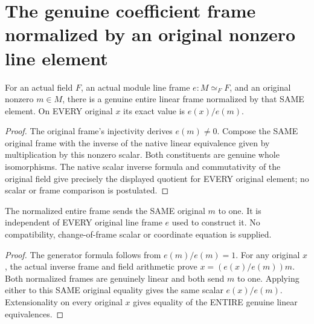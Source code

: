 \section{The genuine coefficient frame normalized by an original nonzero line element}
\label{sec:normalized-line-frame}

\begin{definition}
\label{sc0-normalized-line-frame:whole-equivalence}
\leanok
For an actual field $F$, an actual module line frame $e:M\simeq_F F$,
and an original nonzero $m\in M$, there is a genuine entire linear
frame normalized by that SAME element. On EVERY original $x$ its exact
value is $e(x)/e(m)$.
\end{definition}
\begin{proof}
The original frame's injectivity derives $e(m)\ne0$. Compose the SAME
original frame with the inverse of the native linear equivalence given
by multiplication by this nonzero scalar. Both constituents are genuine
whole isomorphisms. The native scalar inverse formula and commutativity
of the original field give precisely the displayed quotient for EVERY
original element; no scalar or frame comparison is postulated.
\end{proof}

\begin{theorem}
\label{sc0-normalized-line-frame:normalization-independent}
\leanok
The normalized entire frame sends the SAME original $m$ to one. It is
independent of EVERY original line frame $e$ used to construct it.
No compatibility, change-of-frame scalar or coordinate equation is supplied.
\end{theorem}
\begin{proof}
The generator formula follows from $e(m)/e(m)=1$. For any original $x$,
the actual inverse frame and field arithmetic prove
$x=(e(x)/e(m))m$. Both normalized frames are genuinely linear and both
send $m$ to one. Applying either to this SAME original equality gives
the same scalar $e(x)/e(m)$. Extensionality on every original $x$ gives
equality of the ENTIRE genuine linear equivalences.
\end{proof}
